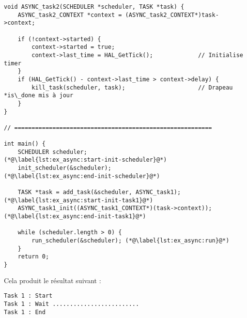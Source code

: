 \begin{lstlisting}
void ASYNC_task2(SCHEDULER *scheduler, TASK *task) {
    ASYNC_task2_CONTEXT *context = (ASYNC_task2_CONTEXT*)task->context;

    if (!context->started) {
        context->started = true;
        context->last_time = HAL_GetTick();             // Initialise timer
    }
    if (HAL_GetTick() - context->last_time > context->delay) {
        kill_task(scheduler, task);                     // Drapeau *is\_done mis à jour
    }
}

// =========================================================

int main() {
    SCHEDULER scheduler;                                      (*@\label{lst:ex_async:start-init-scheduler}@*)
    init_scheduler(&scheduler);                               (*@\label{lst:ex_async:end-init-scheduler}@*)

    TASK *task = add_task(&scheduler, ASYNC_task1);           (*@\label{lst:ex_async:start-init-task1}@*)
    ASYNC_task1_init((ASYNC_task1_CONTEXT*)(task->context));  (*@\label{lst:ex_async:end-init-task1}@*)

    while (scheduler.length > 0) {
        run_scheduler(&scheduler); (*@\label{lst:ex_async:run}@*)
    }
    return 0;
}
\end{lstlisting}

\newpage

Cela produit le résultat suivant :
\begin{lstlisting}[style=terminal, frame=shadowbox, caption={Résultat xemple asynchrone}, label={lst:res_ex_async}]
Task 1 : Start
Task 1 : Wait .........................
Task 1 : End
\end{lstlisting}

